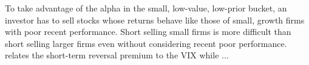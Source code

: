 To take advantage of the alpha in the small, low-value, low-prior bucket, an
investor has to sell stocks whose returns behave like those of small, growth
firms with poor recent performance.
Short selling small firms is more difficult than short selling larger firms
even without considering recent poor performance.
\textcite{nagel2012evaporating} relates the short-term reversal premium to the
VIX while \textcite{nagel2005short} ...


